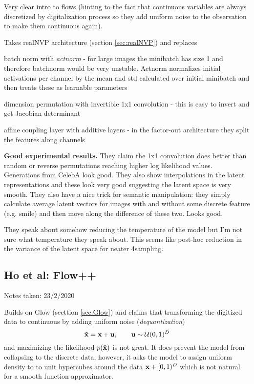 Very clear intro to flows (hinting to the fact that continuous variables are always discretized by digitalization process so they add uniform noise to the observation to make them continuous again).

Takes realNVP architecture (section \ref{sec:realNVP}) and replaces 
\begin{compactitem}
\item batch norm with \emph{actnorm} - for large images the minibatch has size 1 and therefore batchnorm would be very unstable. Actnorm normalizes initial activations per channel by the mean and std calculated over initial minibatch and then treats these as learnable parameters
\item dimension permutation with invertible 1x1 convolution - this is easy to invert and get Jacobian determinant
\item affine coupling layer with additive layers - in the factor-out architecture they split the features along channels
\end{compactitem}

\textbf{Good experimental results.} They claim the 1x1 convolution does better than random or reverse permutations reaching higher log likelihood values. Generations from CelebA look good.
They also show interpolations in the latent representations and these look very good suggesting the latent space is very smooth. 
They also have a nice trick for semantic manipulation: they simply calculate average latent vectors for images with and without some discrete feature (e.g. smile) and then move along the difference of these two. Looks good.

They speak about somehow reducing the temperature of the model but I'm not sure what temperature they speak about. This seems like post-hoc reduction in the variance of the latent space for neater 4sampling.


\subsection{Ho et al: Flow++}

\begin{notebox}

\hfill Notes taken: 23/2/2020 
\end{notebox}

Builds on Glow (secttion \ref{sec:Glow}) and claims that transforming the digitized data to continuous by adding uniform noise (\emph{dequantization})
\begin{equation}
\tilde{\mathbf{x}} = \mathbf{x} + \mathbf{u}, \qquad \mathbf{u} \sim \mathcal{U}(0, 1)^D
\end{equation}
and maximizing the likelihood $p(\tilde{\mathbf{x}})$ is not great.
It does prevent the model from collapsing to the discrete data, however, it asks the model to assign uniform density to to unit hypercubes around the data $\mathbf{x} + [0, 1)^D$ which is not natural for a smooth function approximator.

